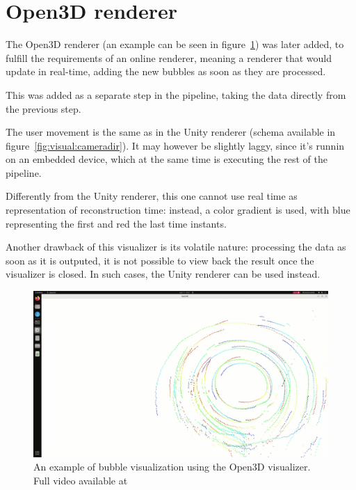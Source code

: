 \section{Open3D renderer}
\label{sec:visual:o3d}

The Open3D renderer (an example can be seen in figure~\ref{sec:visual:o3d}) was later added, to fulfill the requirements of an online renderer, meaning a renderer that would update in real-time, adding the new bubbles as soon as they are processed.

This was added as a separate step in the pipeline, taking the data directly from the previous step.

The user movement is the same as in the Unity renderer (schema available in figure~\ref{fig:visual:cameradir}).
It may however be slightly laggy, since it's runnin on an embedded device, which at the same time is executing the rest of the pipeline.

Differently from the Unity renderer, this one cannot use real time as representation of reconstruction time: instead, a color gradient is used, with blue representing the first and red the last time instants.

Another drawback of this visualizer is its volatile nature: processing the data as soon as it is outputed, it is not possible to view back the result once the visualizer is closed.
In such cases, the Unity renderer can be used instead.

\begin{figure}
	\centerline{\includegraphics[width=\locateimgsize]{images/visual/o3d.png}}
	\caption{\centering An example of bubble visualization using the Open3D visualizer. Full video available at~\cite{visual-o3d}}
	\label{fig:visual:o3d}
\end{figure}
